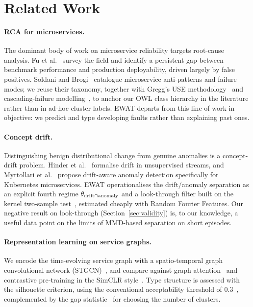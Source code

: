 \section{Related Work}
\label{sec:related}

\paragraph{RCA for microservices.}
The dominant body of work on microservice reliability targets root-cause analysis. Fu et
al.~\cite{fu2025} survey the field and identify a persistent gap between benchmark performance and
production deployability, driven largely by false positives. Soldani and Brogi~\cite{soldani2022}
catalogue microservice anti-patterns and failure modes; we reuse their taxonomy, together with
Gregg's USE methodology~\cite{gregg2013} and cascading-failure modelling~\cite{aniello2014}, to
anchor our OWL class hierarchy in the literature rather than in ad-hoc cluster labels. EWAT
departs from this line of work in objective: we predict and type developing faults rather than
explaining past ones.

\paragraph{Concept drift.}
Distinguishing benign distributional change from genuine anomalies is a concept-drift problem.
Hinder et al.~\cite{hinder2024} formalise drift in unsupervised streams, and Myrtollari et
al.~\cite{myrtollari2025} propose drift-aware anomaly detection specifically for Kubernetes
microservices. EWAT operationalises the drift/anomaly separation as an explicit fourth regime
$\theta_{\text{drift}\cap\text{anomaly}}$ and a look-through filter built on the kernel two-sample test~\cite{gretton2012},
estimated cheaply with Random Fourier Features. Our negative result on look-through
(Section~\ref{sec:validity}) is, to our knowledge, a useful data point on the limits of MMD-based
separation on short episodes.

\paragraph{Representation learning on service graphs.}
We encode the time-evolving service graph with a spatio-temporal graph convolutional network
(STGCN)~\cite{yu2018}, and compare against graph attention~\cite{velivckovic2018} and contrastive
pre-training in the SimCLR style~\cite{chen2020simclr}. Type structure is assessed with the
silhouette criterion, using the conventional acceptability threshold of $0.3$~\cite{kaufman1990},
complemented by the gap statistic~\cite{tibshirani2001} for choosing the number of clusters.

